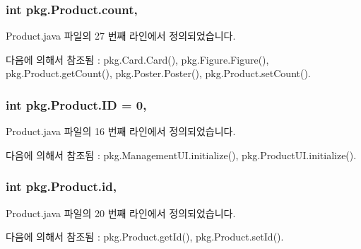 \subsubsection[{\texorpdfstring{count}{count}}]{\setlength{\rightskip}{0pt plus 5cm}int pkg.\+Product.\+count\hspace{0.3cm}{\ttfamily [protected]}, {\ttfamily [inherited]}}\hypertarget{classpkg_1_1_product_ac136af1e8637edc22218dd9c3383266b}{}\label{classpkg_1_1_product_ac136af1e8637edc22218dd9c3383266b}


Product.\+java 파일의 27 번째 라인에서 정의되었습니다.



다음에 의해서 참조됨 \+:  pkg.\+Card.\+Card(), pkg.\+Figure.\+Figure(), pkg.\+Product.\+get\+Count(), pkg.\+Poster.\+Poster(), pkg.\+Product.\+set\+Count().

\subsubsection[{\texorpdfstring{ID}{ID}}]{\setlength{\rightskip}{0pt plus 5cm}int pkg.\+Product.\+ID = 0\hspace{0.3cm}{\ttfamily [static]}, {\ttfamily [inherited]}}\hypertarget{classpkg_1_1_product_a228b3c9d89ad6a4f6637bf1f6f74ff64}{}\label{classpkg_1_1_product_a228b3c9d89ad6a4f6637bf1f6f74ff64}


Product.\+java 파일의 16 번째 라인에서 정의되었습니다.



다음에 의해서 참조됨 \+:  pkg.\+Management\+U\+I.\+initialize(), pkg.\+Product\+U\+I.\+initialize().

\subsubsection[{\texorpdfstring{id}{id}}]{\setlength{\rightskip}{0pt plus 5cm}int pkg.\+Product.\+id\hspace{0.3cm}{\ttfamily [protected]}, {\ttfamily [inherited]}}\hypertarget{classpkg_1_1_product_ac7846687b2d11faba3be1395fcbbab72}{}\label{classpkg_1_1_product_ac7846687b2d11faba3be1395fcbbab72}


Product.\+java 파일의 20 번째 라인에서 정의되었습니다.



다음에 의해서 참조됨 \+:  pkg.\+Product.\+get\+Id(), pkg.\+Product.\+set\+Id().

